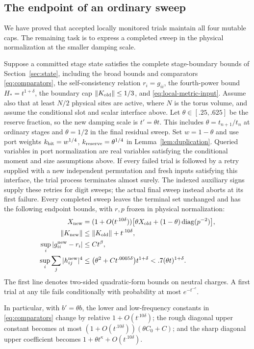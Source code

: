 \subsection{The endpoint of an ordinary sweep}

We have proved that accepted locally monitored trials maintain all four
mutable caps.  The remaining task is to express a completed sweep in the physical
normalization at the smaller damping scale.

\begin{proposition}\label{prop:ordinary-sweep}
Suppose a committed stage state satisfies the complete stage-boundary
bounds of Section~\ref{sec:state}, including the broad bounds and
comparators \eqref{eq:comparators}, the self-consistency relation
\(r_i=g_{ii}\), the fourth-power bound \(H_*=t^{1+\delta}\), the boundary
cap \(\|K_{\rm old}\|\le1/3\), and
\eqref{eq:local-metric-input}.  Assume also that at least \(N/2\)
physical sites are active, where \(N\) is the torus volume, and assume
the conditional slot and scalar interface above.
Let \(\theta\in[.25,.625]\) be the reserve fraction, so the new
damping scale is \(t'=\theta t\).  This includes
\(\theta=t_{n+1}/t_n\) at ordinary stages and \(\theta=1/2\) in the
final residual sweep.  Set \(w=1-\theta\) and use port weights
\(k_{\rm bit}=w^{1/4}\), \(k_{\rm reserve}=\theta^{1/4}\) in
Lemma~\ref{lem:duplication}.  Queried variables in port normalization
are real variables satisfying the conditional moment and size
assumptions above.  If every failed trial is followed by a retry supplied
with a new independent permutation and fresh inputs satisfying this
interface, the trial process terminates almost surely.  The indexed
auxiliary signs supply these retries for digit sweeps; the actual final
sweep instead aborts at its first failure.  Every completed sweep leaves
the terminal set unchanged and has the following endpoint bounds, with \(r,p\) frozen
in physical normalization:
\begin{align*}
 X_{\rm new}
  &=(1+O(t^{.10\delta}))
       \big[\theta X_{\rm old}
               +(1-\theta)\operatorname{diag}(p^{-2})\big],\\
 \|K_{\rm new}\|&\le\|K_{\rm old}\|+t^{.10\delta},\\
 \sup_i|g^{\rm new}_{ii}-r_i|&\le Ct^\beta,\\
 \sup_i\sum_j|h^{\rm new}_{ij}|^4
   &\le\big(\theta^2+Ct^{.0005\delta}\big)t^{1+\delta}
     <.7(\theta t)^{1+\delta}.
\end{align*}
The first line denotes two-sided quadratic-form bounds on neutral
charges.  A first trial at any tile fails conditionally with probability
at most \(e^{-t^{-c}}\).

In particular, with \(b'=\theta b\), the lower and low-frequency
constants in \eqref{eq:comparators} change by relative
\(1+O(t^{.10\delta})\); the rough diagonal upper constant becomes at
most \((1+O(t^{.10\delta}))(\theta C_0+C)\); and the sharp diagonal
upper coefficient becomes
\(1+\theta t^\kappa+O(t^{.10\delta})\).
\end{proposition}

